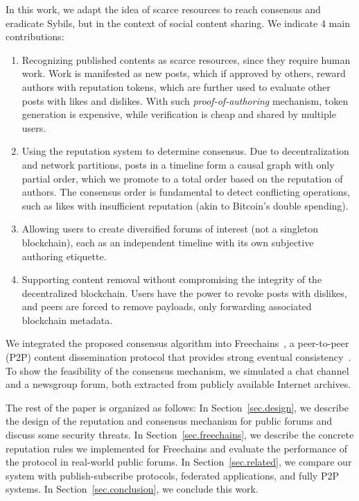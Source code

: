 \documentclass[12pt]{article}
\newcommand{\FC}       {Freechains\xspace}
\begin{document}
In this work, we adapt the idea of scarce resources to reach consensus and
eradicate Sybils, but in the context of social content sharing.
We indicate 4 main contributions:
%
\begin{enumerate}
\item Recognizing published contents as scarce resources, since they require
human work.
Work is manifested as new posts, which if approved by others, reward authors
with reputation tokens, which are further used to evaluate other posts with
likes and dislikes.
With such \emph{proof-of-authoring} mechanism, token generation is expensive,
while verification is cheap and shared by multiple users.
%
\item Using the reputation system to determine consensus.
Due to decentralization and network partitions, posts in a timeline form a
causal graph with only partial order, which we promote to a total order based
on the reputation of authors.
The consensus order is fundamental to detect conflicting operations, such as
likes with insufficient reputation (akin to Bitcoin's double spending).
%
\item Allowing users to create diversified forums of interest (not a
singleton blockchain), each as an independent timeline with its own
subjective authoring etiquette.
%
\item Supporting content removal without compromising the integrity of the
decentralized blockchain.
Users have the power to revoke posts with dislikes, and peers are forced to
remove payloads, only forwarding associated blockchain metadata.
\end{enumerate}
%
We integrated the proposed consensus algorithm into \FC~\cite{fcs.sbseg20}, a
peer-to-peer (P2P) content dissemination protocol that provides strong eventual
consistency~\cite{p2p.sec}.
To show the feasibility of the consensus mechanism, we simulated a chat channel
and a newsgroup forum, both extracted from publicly available Internet archives.

The rest of the paper is organized as follows:
In Section~\ref{sec.design}, we describe the design of the reputation and
consensus mechanism for public forums and discuss some security threats.
In Section~\ref{sec.freechains}, we describe the concrete reputation rules we
implemented for \FC and evaluate the performance of the protocol in real-world
public forums.
In Section~\ref{sec.related}, we compare our system with publish-subscribe
protocols, federated applications, and fully P2P systems.
In Section~\ref{sec.conclusion}, we conclude this work.
\end{document}
